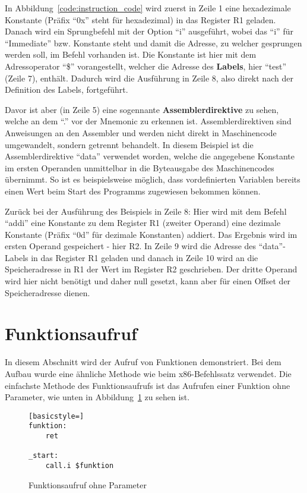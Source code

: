 In Abbildung~\ref{code:instruction_code} wird zuerst in Zeile 1 eine
hexadezimale Konstante (Präfix "`0x"' steht für hexadezimal) in das Register R1
geladen. Danach wird ein Sprungbefehl mit der Option "`i"' ausgeführt, wobei das
"`i"' für "`Immediate"' bzw. Konstante steht und damit die Adresse, zu welcher
gesprungen werden soll, im Befehl vorhanden ist.  Die Konstante ist hier mit dem
Adressoperator "`\$"' vorangestellt, welcher die Adresse des \textbf{Labels}, hier
"`test"' (Zeile 7), enthält. Dadurch wird die Ausführung in Zeile 8, also direkt
nach der Definition des Labels, fortgeführt.

Davor ist aber (in Zeile 5) eine sogennante \textbf{Assemblerdirektive}
zu sehen, welche an dem "`."' vor der Mnemonic zu erkennen ist.
Assemblerdirektiven sind Anweisungen an den Assembler und werden nicht direkt in
Maschinencode umgewandelt, sondern getrennt behandelt. In diesem Beispiel ist
die Assemblerdirektive "`data"' verwendet worden, welche die angegebene Konstante
im ersten Operanden unmittelbar in die Byteausgabe des Maschinencodes übernimmt.
So ist es beispielsweise möglich, dass vordefinierten Variablen bereits einen
Wert beim Start des Programms zugewiesen bekommen können.

Zurück bei der Ausführung des Beispiels in Zeile 8: Hier wird mit dem Befehl
"`addi"' eine Konstante zu dem Register R1 (zweiter Operand) eine dezimale
Konstante (Präfix "`0d"' für dezimale Konstanten) addiert. Das Ergebnis wird im
ersten Operand gespeichert - hier R2. In Zeile 9 wird die Adresse des
"`data"'-Labels in das Register R1 geladen und danach in Zeile 10 wird an die
Speicheradresse in R1 der Wert im Register R2 geschrieben. Der dritte Operand
wird hier nicht benötigt und daher null gesetzt, kann aber für einen Offset der
Speicheradresse dienen.
\pagebreak
\section{Funktionsaufruf}
In diesem Abschnitt wird der Aufruf von Funktionen demonstriert. Bei dem
Aufbau wurde eine ähnliche Methode wie beim x86-Befehlssatz verwendet. Die
einfachste Methode des Funktionsaufrufs ist das Aufrufen einer Funktion ohne
Parameter, wie unten in Abbildung~\ref{code:function_struct}  zu sehen ist.

\begin{figure}[htb]
\begin{lstlisting}[basicstyle=]
funktion:
	ret

_start:
	call.i $funktion
\end{lstlisting}
\caption{Funktionsaufruf ohne Parameter}
\label{code:function_struct}
\end{figure}

